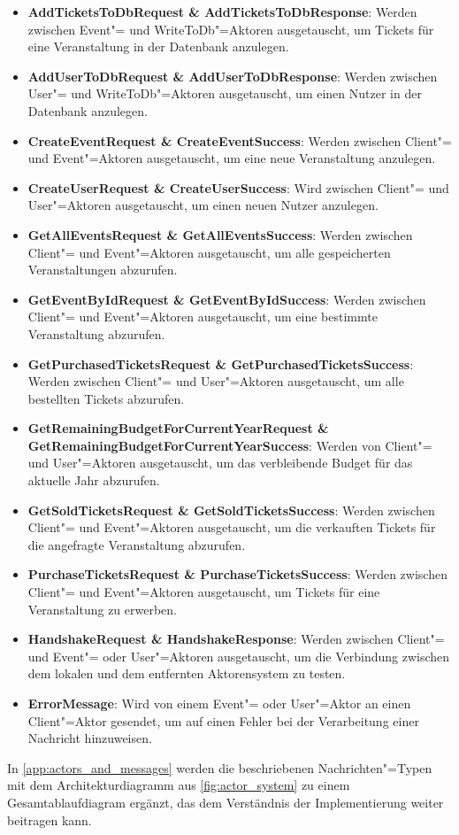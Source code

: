 \begin{itemize}[itemsep=-.5em,leftmargin=*]
    \item \textbf{AddTicketsToDbRequest \& AddTicketsToDbResponse}: Werden zwischen Event"= und WriteToDb"=Aktoren ausgetauscht, um Tickets für eine Veranstaltung in der Datenbank anzulegen.
    \item \textbf{AddUserToDbRequest \& AddUserToDbResponse}: Werden zwischen User"= und WriteToDb"=Aktoren ausgetauscht, um einen Nutzer in der Datenbank anzulegen.
    \item \textbf{CreateEventRequest \& CreateEventSuccess}:  Werden zwischen Client"= und Event"=Aktoren ausgetauscht, um eine neue Veranstaltung anzulegen.
    \item \textbf{CreateUserRequest \& CreateUserSuccess}: Wird zwischen Client"= und User"=Aktoren ausgetauscht, um einen neuen Nutzer anzulegen.
    \item \textbf{GetAllEventsRequest \& GetAllEventsSuccess}: Werden zwischen Client"= und Event"=Aktoren ausgetauscht, um alle gespeicherten Veranstaltungen abzurufen.
    \item \textbf{GetEventByIdRequest \& GetEventByIdSuccess}: Werden zwischen Client"= und Event"=Aktoren ausgetauscht, um eine bestimmte Veranstaltung abzurufen.
    \item \textbf{GetPurchasedTicketsRequest \& GetPurchasedTicketsSuccess}: Werden zwischen Client"= und User"=Aktoren ausgetauscht, um alle bestellten Tickets abzurufen.
    \item \textbf{GetRemainingBudgetForCurrentYearRequest \& GetRemainingBudgetForCurrentYearSuccess}: Werden von Client"= und User"=Aktoren ausgetauscht, um das verbleibende Budget für das aktuelle Jahr abzurufen.
    \item \textbf{GetSoldTicketsRequest \& GetSoldTicketsSuccess}: Werden zwischen Client"= und Event"=Aktoren ausgetauscht, um die verkauften Tickets für die angefragte Veranstaltung abzurufen.
    \item \textbf{PurchaseTicketsRequest \& PurchaseTicketsSuccess}: Werden zwischen Client"= und Event"=Aktoren ausgetauscht, um Tickets für eine Veranstaltung zu erwerben.
    \item \textbf{HandshakeRequest \& HandshakeResponse}: Werden zwischen Client"= und Event"= oder User"=Aktoren ausgetauscht, um die Verbindung zwischen dem lokalen und dem entfernten Aktorensystem zu testen.
    \item \textbf{ErrorMessage}: Wird von einem Event"= oder User"=Aktor an einen Client"=Aktor gesendet, um auf einen Fehler bei der Verarbeitung einer Nachricht hinzuweisen.
\end{itemize}

In \autoref{app:actors_and_messages} werden die beschriebenen Nachrichten"=Typen mit dem Architekturdiagramm aus \autoref{fig:actor_system} zu einem Gesamtablaufdiagram ergänzt, das dem Verständnis der Implementierung weiter beitragen kann.
